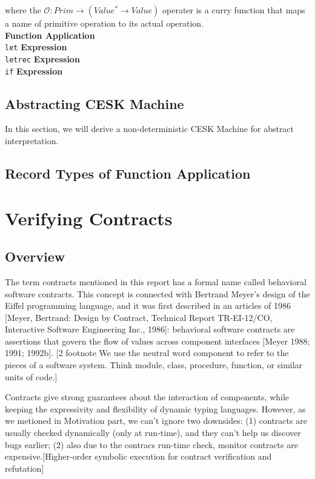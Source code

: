 \documentclass[paper=a4, fontsize=11pt]{scrartcl} %
\numberwithin{equation}{section} %
\numberwithin{figure}{section} %
\numberwithin{table}{section} %
\begin{document}
where the $\mathcal{O} : Prim \rightarrow (Value^* \rightarrow Value)$ operater is a curry function that maps a name of primitive operation to its actual operation.\\

\textbf{Function Application}\\
\texttt{let} \textbf{Expression}\\
\texttt{letrec} \textbf{Expression}\\
\texttt{if} \textbf{Expression}\\


\subsection{Abstracting CESK Machine}

In this section, we will derive a non-deterministic CESK Machine for abstract interpretation.

\subsection{Record Types of Function Application}


\section{Verifying Contracts}

\subsection{Overview}
The term contracts mentioned in this report has a formal name called behavioral software contracts. This concept is connected with Bertrand Meyer's design of the Eiffel programming language, and it was first described in an articles of 1986 [Meyer, Bertrand: Design by Contract, Technical Report TR-EI-12/CO, Interactive Software Engineering Inc., 1986]: behavioral software contracts are assertions that govern the flow of values across component interfaces [Meyer 1988; 1991; 1992b].
[2 footnote We use the neutral word component to refer to the pieces of a software system. Think module, class, procedure, function, or similar units of code.]

Contracts give strong guarantees about the interaction of components, while keeping the expressivity and flexibility of dynamic typing languages. However, as we metioned in Motivation part, we can't ignore two downsides: (1) contracts are usually checked dynamically (only at run-time), and they can't help us discover bugs earlier; (2) also due to the contracs run-time check, monitor contracts are expensive.[Higher-order symbolic execution for contract verification and refutation]
\end{document}
